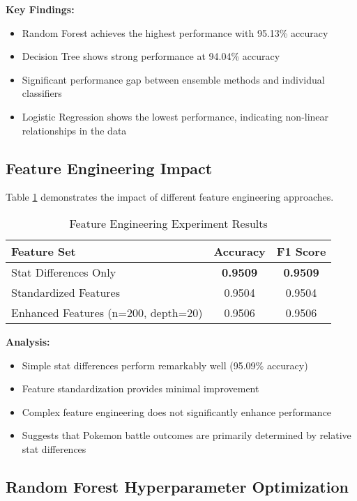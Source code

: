 \documentclass[12pt,a4paper]{article}
\begin{document}
\textbf{Key Findings:}
\begin{itemize}
    \item Random Forest achieves the highest performance with 95.13\% accuracy
    \item Decision Tree shows strong performance at 94.04\% accuracy
    \item Significant performance gap between ensemble methods and individual classifiers
    \item Logistic Regression shows the lowest performance, indicating non-linear relationships in the data
\end{itemize}

\subsection{Feature Engineering Impact}

Table \ref{tab:feature_engineering} demonstrates the impact of different feature engineering approaches.

\begin{table}[H]
\centering
\caption{Feature Engineering Experiment Results}
\label{tab:feature_engineering}
\begin{tabular}{lcc}
\toprule
\textbf{Feature Set} & \textbf{Accuracy} & \textbf{F1 Score} \\
\midrule
Stat Differences Only & \textbf{0.9509} & \textbf{0.9509} \\
Standardized Features & 0.9504 & 0.9504 \\
Enhanced Features (n=200, depth=20) & 0.9506 & 0.9506 \\
\bottomrule
\end{tabular}
\end{table}

\textbf{Analysis:}
\begin{itemize}
    \item Simple stat differences perform remarkably well (95.09\% accuracy)
    \item Feature standardization provides minimal improvement
    \item Complex feature engineering does not significantly enhance performance
    \item Suggests that Pokemon battle outcomes are primarily determined by relative stat differences
\end{itemize}

\subsection{Random Forest Hyperparameter Optimization}
\end{document}
